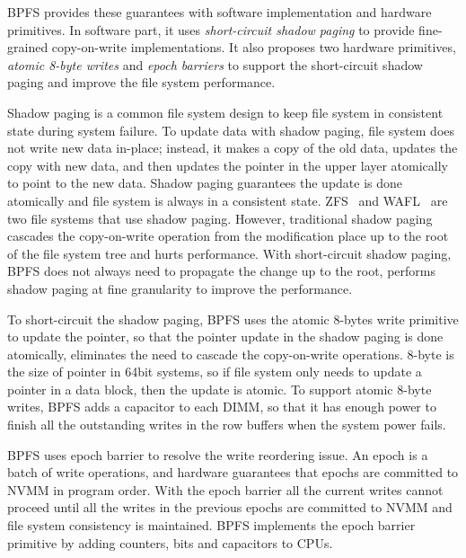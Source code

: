 BPFS provides these guarantees with software implementation and hardware
primitives. In software part, it uses \emph{short-circuit shadow paging}
to provide fine-grained copy-on-write implementations. It also proposes
two hardware primitives, \emph{atomic 8-byte writes} and \emph{epoch barriers}
to support the short-circuit shadow paging and improve the file system
performance.

Shadow paging is a common file system design to keep file system in consistent
state during system failure. To update data with shadow paging, file system
does not write new data in-place; instead, it makes a copy of the old data,
updates the copy with new data, and then updates the pointer in the upper layer
atomically to point to the new data. Shadow paging guarantees the update is done
atomically and file system is always in a consistent state.
 ZFS~\cite{zfs} and WAFL~\cite{wafl} are two file
systems that use shadow paging. However, traditional shadow paging cascades
the copy-on-write operation from the modification place up to the root of 
the file system tree and hurts performance. With short-circuit shadow paging,
BPFS does not always need to propagate the change up to the root, performs
shadow paging at fine granularity to improve the performance.

To short-circuit the shadow paging, BPFS uses the atomic 8-bytes write primitive
to update the pointer, so that the pointer update in the shadow paging is done
atomically, eliminates the need to cascade the copy-on-write operations.
8-byte is the size of pointer in 64bit systems, so if file system only needs to
update a pointer in a data block, then the update is atomic. To support
atomic 8-byte writes, BPFS adds a capacitor to each DIMM, so that it has enough
power to finish all the outstanding writes in the row buffers when the system
power fails.

 BPFS uses
epoch barrier to resolve the write reordering issue. 
An epoch is a batch of write operations,
and hardware guarantees that epochs are committed to NVMM in program order.
With the epoch barrier all the current writes cannot proceed until all the
writes in the previous epochs are committed to NVMM and file system consistency
is maintained. BPFS implements the epoch barrier primitive by adding counters,
bits and capacitors to CPUs.

